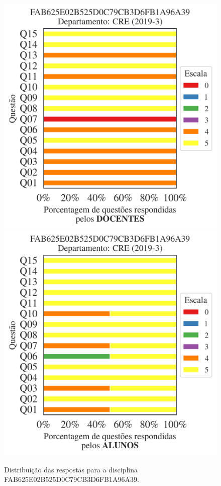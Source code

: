 \documentclass[a4paper,10pt]{article}
\begin{document}
\begin{figure}[h]
\centering
\includegraphics[width=0.485\linewidth]{analise_disciplina_departamento_CRE_FAB625E02B525D0C79CB3D6FB1A96A39_docentes.png}
\includegraphics[width=0.485\linewidth]{analise_disciplina_departamento_CRE_FAB625E02B525D0C79CB3D6FB1A96A39_alunos.png}
\caption{\label{fig:analise_geral_departamento}                Distribuição das respostas para a disciplina FAB625E02B525D0C79CB3D6FB1A96A39. }
\end{figure}
\end{document}
